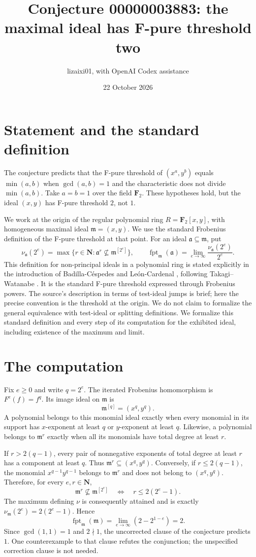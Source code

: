\documentclass[11pt]{article}
\title{Conjecture 00000003883: the maximal ideal has F-pure threshold two}
\author{lizaixi01, with OpenAI Codex assistance}
\date{22 October 2026}
\begin{document}
\maketitle
\section{Statement and the standard definition}
The conjecture predicts that the F-pure threshold of $(x^a,y^b)$ equals
$\min(a,b)$ when $\gcd(a,b)=1$ and the characteristic does not divide
$\min(a,b)$. Take $a=b=1$ over the field $\mathbf F_2$. These hypotheses
hold, but the ideal $(x,y)$ has F-pure threshold $2$, not $1$.

We work at the origin of the regular polynomial ring
$R=\mathbf F_2[x,y]$, with homogeneous maximal ideal $\mathfrak m=(x,y)$.
We use the standard Frobenius definition of the F-pure threshold at that
point. For an ideal $\mathfrak a\subseteq\mathfrak m$, put
\[
 \nu_{\mathfrak a}(2^e)=\max\{r\in\mathbf N:
        \mathfrak a^r\not\subseteq\mathfrak m^{[2^e]}\},\qquad
 \operatorname{fpt}_{\mathfrak m}(\mathfrak a)
       =\lim_{e\to\infty}\frac{\nu_{\mathfrak a}(2^e)}{2^e}.
\]
This definition for non-principal ideals in a polynomial ring is stated
explicitly in the introduction of Badilla-C\'espedes and
Le\'on-Cardenal \cite{BC}, following Takagi--Watanabe \cite{TW}.
It is the standard F-pure threshold expressed through Frobenius powers.
The source's description in terms of test-ideal jumps is brief; here the
precise convention is the threshold at the origin. We do not claim to
formalize the general equivalence with test-ideal or splitting definitions.
We formalize this standard definition and every step of its computation
for the exhibited ideal, including existence of the maximum and limit.

\section{The computation}
Fix $e\geq0$ and write $q=2^e$. The iterated Frobenius homomorphism is
$F^e(f)=f^q$. Its image ideal on $\mathfrak m$ is
\[
 \mathfrak m^{[q]}=(x^q,y^q).
\]
A polynomial belongs to this monomial ideal exactly when every monomial
in its support has $x$-exponent at least $q$ or $y$-exponent at least $q$.
Likewise, a polynomial belongs to $\mathfrak m^r$ exactly when all its
monomials have total degree at least $r$.

If $r>2(q-1)$, every pair of nonnegative exponents of total degree at
least $r$ has a component at least $q$. Thus
$\mathfrak m^r\subseteq(x^q,y^q)$.
Conversely, if $r\leq2(q-1)$, the monomial $x^{q-1}y^{q-1}$ belongs to
$\mathfrak m^r$ and does not belong to $(x^q,y^q)$. Therefore, for every
$e,r\in\mathbf N$,
\[
 \mathfrak m^r\not\subseteq\mathfrak m^{[2^e]}
   \quad\Longleftrightarrow\quad r\leq2(2^e-1).
\]
The maximum defining $\nu$ is consequently attained and is exactly
$\nu_{\mathfrak m}(2^e)=2(2^e-1)$. Hence
\[
 \operatorname{fpt}_{\mathfrak m}(\mathfrak m)
    =\lim_{e\to\infty}(2-2^{1-e})=2.
\]
Since $\gcd(1,1)=1$ and $2\nmid1$, the uncorrected clause of the
conjecture predicts $1$. One counterexample to that clause refutes the
conjunction; the unspecified correction clause is not needed.
\end{document}
